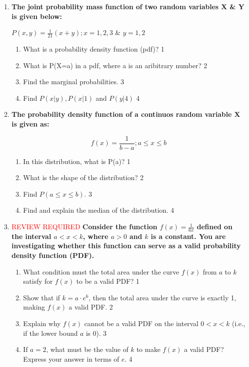 \documentclass[a4paper,oneside]{book}
\providecommand{\fillin}[1]{\textcolor{red}{#1}}%
\begin{document}
\begin{enumerate}
 \item
	  \textbf{The joint probability mass function of two random variables X \& Y is given below:}

\begin{center}
$P(x,y) = \frac{1}{21}(x+y); x=1,2,3$ \& $y = 1,2$ 
\end{center}
  
  \begin{enumerate}
    \item
	What is a probability density function (pdf)? \hfill 1
    \item
	What is P(X=a) in a pdf, where a is an aribitrary number? \hfill 2
    \item  
	Find the marginal probabilities. \hfill 3
    \item
	Find $P(x \vert y), P(x \vert 1)$ and $P(y|4)$ \hfill 4
  \end{enumerate}
  
  \item
	  \textbf{The probability density function of a continuos random variable X is given as:}
	  
	  $$f(x) = \frac 1 {b-a}; a\le x\le b$$
  
  \begin{enumerate}
    \item
	In this distribution, what is P(a)? \hfill 1
    \item
    What is the shape of the distribution? \hfill 2	
    \item
	Find $P( a\le x\le b)$. \hfill 3
      \item
	Find and explain the median of the distribution. \hfill 4
  \end{enumerate}

\item
\fillin{REVIEW REQUIRED}
  \textbf{Consider the function $f(x) = \frac{1}{6x}$ defined on the interval $a < x < k$, where $a > 0$ and $k$ is a constant. You are investigating whether this function can serve as a valid probability density function (PDF).}

  \begin{enumerate}
    \item
	What condition must the total area under the curve $f(x)$ from $a$ to $k$ satisfy for $f(x)$ to be a valid PDF? \hfill 1
    \item
	Show that if $k = a \cdot e^6$, then the total area under the curve is exactly 1, making $f(x)$ a valid PDF. \hfill 2
    \item
	Explain why $f(x)$ cannot be a valid PDF on the interval $0 < x < k$ (i.e., if the lower bound $a$ is 0). \hfill 3
    \item
	If $a = 2$, what must be the value of $k$ to make $f(x)$ a valid PDF? Express your answer in terms of $e$. \hfill 4
  \end{enumerate}


\end{enumerate}
\end{document}
